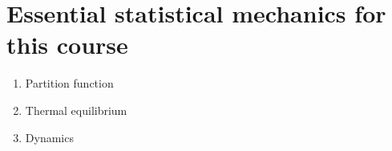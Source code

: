\section{Essential statistical mechanics for this course}

\begin{enumerate}
	\item Partition function
	\item Thermal equilibrium
	\item Dynamics
\end{enumerate}

